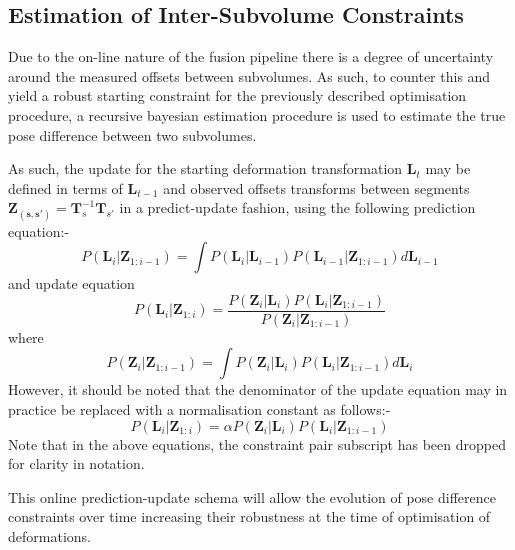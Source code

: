 \subsection{Estimation of Inter-Subvolume Constraints}
Due to the on-line nature of the fusion pipeline there is a degree of uncertainty around the measured offsets between subvolumes. As such, to 
counter this and yield a robust starting constraint for the previously described optimisation procedure, a recursive bayesian estimation 
procedure is used to estimate the true pose difference between two subvolumes.

As such, the update for the starting deformation transformation $\mathbf{L}_{t}$ may be defined in 
terms of $\mathbf{L}_{t-1}$ and observed offsets transforms between segments $\mathbf{Z_{(s, s')}} = \mathbf{T}_{s}^{-1}\mathbf{T}_{s'}$  in a predict-update fashion, using the following prediction equation:-
\begin{equation}
P(\mathbf{L}_{i} | \mathbf{Z}_{1:i-1}) = \int P(\mathbf{L}_{i} | \mathbf{L}_{i-1})P(\mathbf{L}_{i-1} | \mathbf{Z}_{1:i-1}) d\mathbf{L}_{i-1}
\end{equation}
and update equation
\begin{equation}
P(\mathbf{L}_{i} | \mathbf{Z}_{1:i}) = \frac{P(\mathbf{Z}_{i} | \mathbf{L}_{i})P(\mathbf{L}_{i} | \mathbf{Z}_{1:i-1})}{P(\mathbf{Z}_{i} | \mathbf{Z}_{1:i-1})}
\end{equation}
where
\begin{equation}
P(\mathbf{Z}_{i} | \mathbf{Z}_{1:i-1}) = \int P(\mathbf{Z}_{i} | \mathbf{L}_{i})P(\mathbf{L}_{i} | \mathbf{Z}_{1:i-1}) d\mathbf{L}_{i}
\end{equation}
However, it should be noted that the denominator of the update equation may in practice be replaced with a normalisation constant as follows:-
\begin{equation}
P(\mathbf{L}_{i} | \mathbf{Z}_{1:i}) = \alpha P(\mathbf{Z}_{i} | \mathbf{L}_{i})P(\mathbf{L}_{i} | \mathbf{Z}_{1:i-1})
\end{equation}
Note that in the above equations, the constraint pair subscript has been dropped for clarity in notation.

This online prediction-update schema will allow the evolution of pose difference constraints over time increasing their robustness at the time 
of optimisation of deformations.